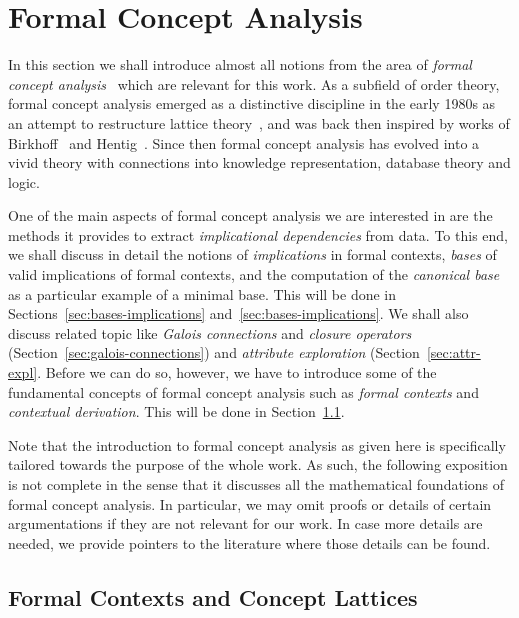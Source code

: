 \chapter{Formal Concept Analysis}
\label{cha:form-conc-analys}

In this section we shall introduce almost all notions from the area of \emph{formal
  concept analysis}~\cite{fca-book} which are relevant for this work.  As a subfield of
order theory, formal concept analysis emerged as a distinctive discipline in the early
1980s as an attempt to restructure lattice theory~\cite{fca:Wille:1982}, and was back then
inspired by works of Birkhoff~\cite{books/math/Birkhoff67} and
Hentig~\cite{books/phil/Hentig72}.  Since then formal concept analysis has evolved into a
vivid theory with connections into knowledge representation, database theory and logic.

One of the main aspects of formal concept analysis we are interested in are the methods it
provides to extract \emph{implicational dependencies} from data.  To this end, we shall
discuss in detail the notions of \emph{implications} in formal contexts, \emph{bases} of
valid implications of formal contexts, and the computation of the \emph{canonical base} as
a particular example of a minimal base.  This will be done in
Sections~\ref{sec:bases-implications} and~\ref{sec:bases-implications}.  We shall also
discuss related topic like \emph{Galois connections} and \emph{closure operators}
(Section~\ref{sec:galois-connections}) and \emph{attribute exploration}
(Section~\ref{sec:attr-expl}.  Before we can do so, however, we have to introduce some of
the fundamental concepts of formal concept analysis such as \emph{formal contexts} and
\emph{contextual derivation}.  This will be done in Section~\ref{sec:form-cont-cont}.

Note that the introduction to formal concept analysis as given here is specifically
tailored towards the purpose of the whole work.  As such, the following exposition is not
complete in the sense that it discusses all the mathematical foundations of formal concept
analysis.  In particular, we may omit proofs or details of certain argumentations if they
are not relevant for our work.  In case more details are needed, we provide pointers to
the literature where those details can be found.

\section{Formal Contexts and Concept Lattices}
\label{sec:form-cont-cont}

